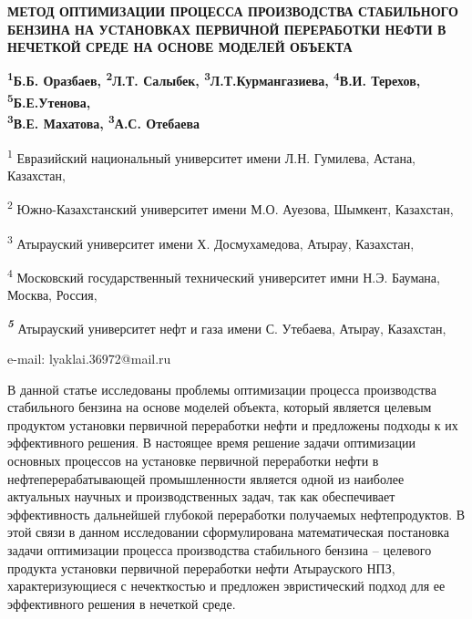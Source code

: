 \begin{center}

{\bfseries МЕТОД ОПТИМИЗАЦИИ ПРОЦЕССА ПРОИЗВОДСТВА СТАБИЛЬНОГО БЕНЗИНА НА УСТАНОВКАХ ПЕРВИЧНОЙ ПЕРЕРАБОТКИ НЕФТИ В НЕЧЕТКОЙ СРЕДЕ НА ОСНОВЕ МОДЕЛЕЙ ОБЪЕКТА}

{\bfseries \textsuperscript{1}Б.Б. Оразбаев, \textsuperscript{2}Л.Т.
Салыбек\envelope , \textsuperscript{3}Л.Т.Курмангазиева,
\textsuperscript{4}В.И. Терехов, \textsuperscript{5}Б.Е.Утенова,\\ \textsuperscript{3}В.Е. Махатова, \textsuperscript{3}А.С.
Отебаева}

\textsuperscript{1} Евразийский национальный университет имени Л.Н.
Гумилева, Астана, Казахстан,

\textsuperscript{2} Южно-Казахстанский университет имени М.О. Ауезова,
Шымкент, Казахстан,

\textsuperscript{3} Атырауский университет имени Х. Досмухамедова,
Атырау, Казахстан,

\textsuperscript{4} Московский государственный технический университет
имни Н.Э. Баумана, Москва, Россия,

\emph{{\bfseries \textsuperscript{5}}} Атырауский университет нефт и газа
имени С. Утебаева, Атырау, Казахстан,

e-mail: lyaklai.36972@mail.ru
\end{center}

В данной статье исследованы проблемы оптимизации процесса производства
стабильного бензина на основе моделей объекта, который является целевым
продуктом установки первичной переработки нефти и предложены подходы к
их эффективного решения. В настоящее время решение задачи оптимизации
основных процессов на установке первичной переработки нефти в
нефтеперерабатывающей промышленности является одной из наиболее
актуальных научных и производственных задач, так как обеспечивает
эффективность дальнейшей глубокой переработки получаемых нефтепродуктов.
В этой связи в данном исследовании сформулирована математическая
постановка задачи оптимизации процесса производства стабильного бензина
-- целевого продукта установки первичной переработки нефти Атырауского
НПЗ, характеризующиеся с нечекткостью и предложен эвристический подход
для ее эффективного решения в нечеткой среде.

